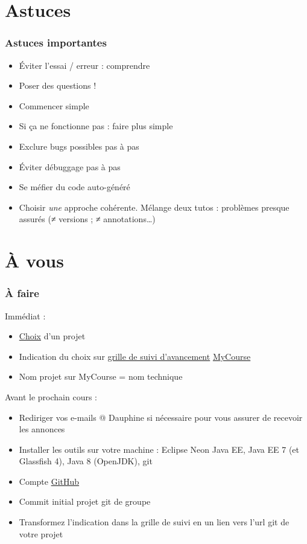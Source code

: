 \documentclass[english, french]{beamer}
\begin{document}
\section{Astuces}
\begin{frame}
	\frametitle{Astuces importantes}
	\begin{itemize}
		\item Éviter l’essai / erreur : comprendre
		\item Poser des questions !
		\item Commencer simple
		\item Si ça ne fonctionne pas : faire plus simple
		\item Exclure bugs possibles pas à pas
		\item Éviter débuggage pas à pas
		\item Se méfier du code auto-généré
		\item Choisir \emph{une} approche cohérente. Mélange deux tutos : problèmes presque assurés ({}≠ versions ; ≠ annotations…)
	\end{itemize}
\end{frame}

\section{À vous}
\begin{frame}
	\frametitle{À faire}
	Immédiat :
	\begin{itemize}
		\item \href{https://github.com/oliviercailloux/projets}{Choix} d’un projet
		\item Indication du choix sur \href{https://mycourse.dauphine.fr/webapps/Bb-wiki-BBLEARN/wikiView?course_id=_36424_1&wiki_id=_26157_1}{grille de suivi d’avancement} \href{https://mycourse.dauphine.fr/webapps/blackboard/execute/courseMain?course_id=_36424_1}{MyCourse}
			\item Nom projet sur MyCourse = nom technique
	\end{itemize}
	Avant le prochain cours :
	\begin{itemize}
		\item Rediriger vos e-mails @ Dauphine si nécessaire pour vous assurer de recevoir les annonces
		\item Installer les outils sur votre machine : Eclipse Neon Java EE, Java EE 7 (et Glassfish 4), Java 8 (OpenJDK), git
		\item Compte \href{https://github.com/}{GitHub}
		\item Commit initial projet git de groupe
		\item Transformez l’indication dans la grille de suivi en un lien vers l’url git de votre projet
	\end{itemize}
\end{frame}
\end{document}
